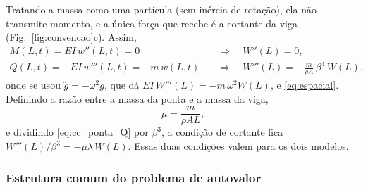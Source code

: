 Tratando a massa como uma partícula (sem inércia de rotação), ela não transmite
momento, e a única força que recebe é a cortante da viga
(Fig.~\ref{fig:convencao}c). Assim,
\begin{subequations}
    \label{eq:cc_ponta}
    \begin{align}
        M(L,t) = EI\,w''(L,t) = 0
         & \quad\Longrightarrow\quad W''(L) = 0, \label{eq:cc_ponta_M}           \\
        Q(L,t) = -EI\,w'''(L,t) = -m\,\ddot w(L,t)
         & \quad\Longrightarrow\quad W'''(L) = -\frac{m}{\rho A}\,\beta^4\,W(L),
        \label{eq:cc_ponta_Q}
    \end{align}
\end{subequations}
onde se usou $\ddot g = -\omega^2 g$, que dá $EI\,W'''(L) = -m\,\omega^2 W(L)$, e
\eqref{eq:espacial}. Definindo a razão entre a
massa da ponta e a massa da viga,
\begin{equation}
    \mu = \frac{m}{\rho A L},
    \label{eq:mu}
\end{equation}
e dividindo \eqref{eq:cc_ponta_Q} por $\beta^3$, a condição de cortante fica
$W'''(L)/\beta^3 = -\mu\lambda\,W(L)$. Essas duas condições valem para os dois
modelos.

\subsubsection{Estrutura comum do problema de autovalor}
\label{sec:estrutura}

